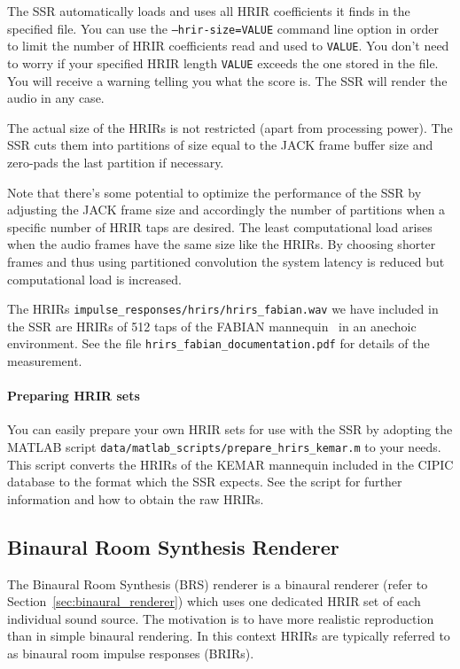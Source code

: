 The SSR automatically loads and uses all HRIR coefficients it finds in the
specified file. You can use the \texttt{--hrir-size=VALUE} command line option in order
to limit the number of HRIR coefficients read and used to \texttt{VALUE}. You
don't need to worry if your specified HRIR length \texttt{VALUE} exceeds the
one stored in the file. You will receive a warning telling you what the score
is. The SSR will render the audio in any case.

The actual size of the HRIRs is not restricted (apart from processing power).
The SSR cuts them into partitions of size equal to the JACK frame buffer size and
zero-pads the last partition if necessary.

Note that there's some potential to optimize the performance of the SSR by
adjusting the JACK frame size and accordingly the number of partitions when a
specific number of HRIR taps are desired. The least computational load arises
when the audio frames have the same size like the HRIRs. By choosing shorter
frames and thus using partitioned convolution the system latency is reduced but
computational load is increased.

The HRIRs \texttt{impulse\_responses/hrirs/hrirs\_fabian.wav} we have included
in the SSR are HRIRs of 512 taps of the FABIAN mannequin~\cite{fabian} in an
anechoic environment. See the file \texttt{hrirs\_fabian\_documentation.pdf}
for details of the measurement.
%
\paragraph{Preparing HRIR sets}%
%
You can easily prepare your own HRIR sets for use with the SSR by adopting
the MATLAB \cite{matlab} script \texttt{data/matlab\_scripts/prepare\_hrirs\_kemar.m}
to your needs. This script converts the HRIRs of the KEMAR mannequin included
in the CIPIC database \cite{cipic} to the format which the SSR expects. See the script for
further information and how to obtain the raw HRIRs.


\subsection{\label{sec:brs}Binaural Room Synthesis Renderer}

The Binaural Room Synthesis (BRS) renderer is a binaural renderer (refer to
Section~\ref{sec:binaural_renderer}) which uses one dedicated HRIR set of each
individual sound source. The motivation is to have more realistic reproduction
than in simple binaural rendering. In this context HRIRs are typically referred
to as binaural room impulse responses (BRIRs).

